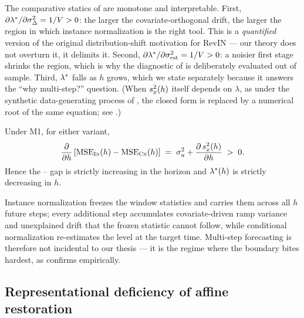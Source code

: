 The comparative statics of  are monotone and interpretable. First, $\partial \lambda^{*} / \partial \sigma_\Delta^2 = 1/V > 0$: the larger the covariate-orthogonal drift, the larger the region in which instance normalization is the right tool. This is a \emph{quantified} version of the original distribution-shift motivation for RevIN --- our theory does not overturn it, it delimits it. Second, $\partial \lambda^{*} / \partial \sigma_{\mathrm{est}}^2 = 1/V > 0$: a noisier first stage shrinks the \cnm{} region, which is why the diagnostic of  is deliberately evaluated out of sample. Third, $\lambda^{*}$ falls as $h$ grows, which we state separately because it answers the ``why multi-step?'' question. (When $s_x^2(h)$ itself depends on $\lambda$, as under the synthetic data-generating process of , the closed form is replaced by a numerical root of the same equation; see .)

\begin{proposition}\label{prop:horizon}
Under M1, for either \cnm{} variant,
\begin{equation}\label{eq:prop3}
  \frac{\partial}{\partial h}\left[\mathrm{MSE}_{\textsc{In}}(h) - \mathrm{MSE}_{\textsc{Cn}}(h)\right]
  \;=\; \sigma_u^2 + \frac{\partial\, s_x^2(h)}{\partial h} \;>\; 0 .
\end{equation}
Hence the \inm{}--\cnm{} gap is strictly increasing in the horizon and $\lambda^{*}(h)$ is strictly decreasing in $h$.
\end{proposition}

Instance normalization freezes the window statistics and carries them across all $h$ future steps; every additional step accumulates covariate-driven ramp variance and unexplained drift that the frozen statistic cannot follow, while conditional normalization re-estimates the level at the target time. Multi-step forecasting is therefore not incidental to our thesis --- it is the regime where the boundary bites hardest, as  confirms empirically.

\subsection{Representational deficiency of affine restoration}

